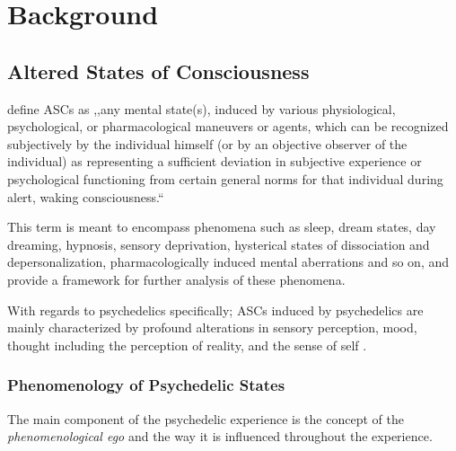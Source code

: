 \chapter{Background}
\vspace{-1.6em}
%

\minitoc
\thispagestyle{empty}
\newpage

\section{Altered States of Consciousness}\label{sec:asc_definition}
\textcite{ludwig1966altered} define \acp{ASC} as ,,any mental state(s), induced by various physiological, psychological, or pharmacological maneuvers or agents, which can be recognized subjectively by the individual himself (or by an objective observer of the individual) as representing a sufficient deviation in subjective experience or psychological functioning from certain general norms for that individual during alert, waking consciousness.``

This term is meant to encompass phenomena such as sleep, dream states, day dreaming, hypnosis, sensory deprivation, hysterical states of dissociation and depersonalization, pharmacologically induced mental aberrations and so on, and provide a framework for further analysis of these phenomena.

With regards to psychedelics specifically; \acp{ASC} induced by psychedelics are mainly characterized by profound alterations in sensory perception, mood, thought including the perception of reality, and the sense of self \autocite{preller2016phenomenology}.

\subsection{Phenomenology of Psychedelic States}
The main component of the psychedelic experience is the concept of the \textit{phenomenological ego} and the way it is influenced throughout the experience.


